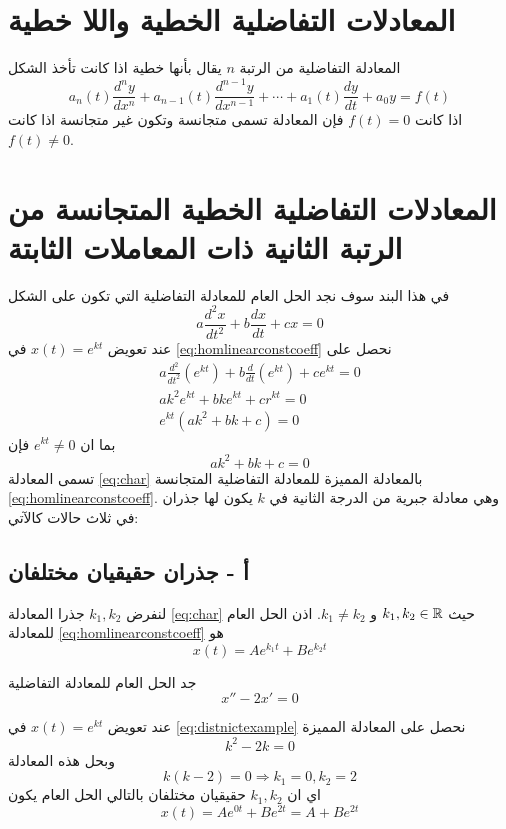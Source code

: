 \section{المعادلات التفاضلية الخطية واللا خطية}
المعادلة التفاضلية من الرتبة $n$ يقال بأنها خطية اذا كانت تأخذ الشكل
\[
a_n(t) \frac{d^n y}{dx^n } + a_{n-1}(t) \frac{d^{n-1}y}{dx^{n-1}} + \cdots + a_1(t) \frac{dy}{dt} + a_0 y = f(t)
\]
اذا كانت $f(t) = 0$ فإن المعادلة تسمى متجانسة وتكون غير متجانسة اذا كانت $f(t) \neq 0$.

\section{المعادلات التفاضلية الخطية المتجانسة من الرتبة الثانية ذات المعاملات الثابتة}
في هذا البند سوف نجد الحل العام للمعادلة التفاضلية التي تكون على الشكل
\begin{equation}
	\label{eq:homlinearconstcoeff}
	a \frac{d^2 x}{dt^2} + b \frac{dx}{dt} + cx = 0
\end{equation}
عند تعويض $x(t) = e^{kt}$ في \eqref{eq:homlinearconstcoeff} نحصل على
\begin{gather*}
	a \frac{d^2}{dt^2} (e^{kt}) + b \frac{d}{dt} (e^{kt}) + c  e^{kt} =0 \\
	ak^2 e^{kt} + bk e^{kt} + cr^{kt} = 0\\
	e^{kt} (ak^2 + bk + c) = 0
 \end{gather*}
 بما ان $e^{kt} \neq 0$ فإن
 \begin{equation}
 	\label{eq:char}
 	ak^2 + bk + c = 0
 \end{equation}
تسمى المعادلة \eqref{eq:char} بالمعادلة المميزة للمعادلة التفاضلية المتجانسة \eqref{eq:homlinearconstcoeff}. وهي معادلة جبرية من الدرجة الثانية في $k$ يكون لها جذران في ثلاث حالات كالآتي:

\subsection*{أ - جذران حقيقيان مختلفان}
لنفرض $k_1, k_2$ جذرا المعادلة \eqref{eq:char} حيث $k_1, k_2\in \mathbb{R}$ و $k_1\neq  k_2$. اذن الحل العام للمعادلة \eqref{eq:homlinearconstcoeff} هو
\[
x(t) = A e^{k_1 t} + B e^{k_2 t}
\]

\begin{example}
	جد الحل العام للمعادلة التفاضلية 
	\begin{equation}
		\label{eq:distnictexample}
		x '' - 2x ' = 0
	\end{equation}
\end{example}
\begin{solution}
	عند تعويض $x(t) = e^{kt}$ في \eqref{eq:distnictexample} نحصل على المعادلة المميزة
	\[
	k^2 - 2k =0 
	\]
	وبحل هذه المعادلة 
	\[
	k(k-2) = 0 \Rightarrow k_1 = 0, k_2= 2
	\]
	اي ان $k_1,k_2$ حقيقيان مختلفان بالتالي الحل العام يكون
	\[
	x(t) = Ae^{0t} + Be^{2t} = A + B e^{2t}
	\]
\end{solution}

